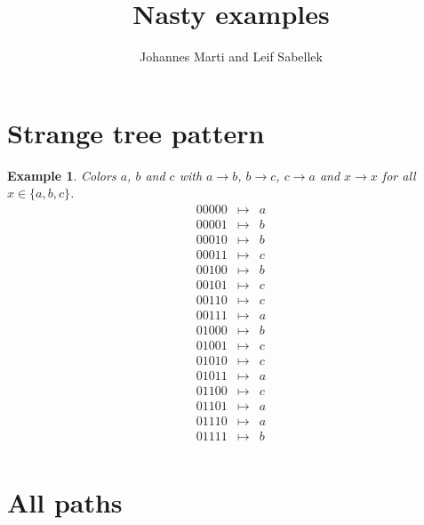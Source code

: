 \documentclass[a4paper]{article}
\title{Nasty examples}
\author{Johannes Marti and Leif Sabellek}
\newtheorem{example}{Example}[section]
\begin{document}
\maketitle

\section{Strange tree pattern}

\begin{example}
Colors $a$, $b$ and $c$ with $a \to b$, $b \to c$, $c \to a$ and $x \to
x$ for all $x \in \{a,b,c\}$.
\[
 \begin{array}{rcl}
 00000 & \mapsto & a \\
 00001 & \mapsto & b \\
 00010 & \mapsto & b \\
 00011 & \mapsto & c \\
 00100 & \mapsto & b \\
 00101 & \mapsto & c \\
 00110 & \mapsto & c \\
 00111 & \mapsto & a \\
 01000 & \mapsto & b \\
 01001 & \mapsto & c \\
 01010 & \mapsto & c \\
 01011 & \mapsto & a \\
 01100 & \mapsto & c \\
 01101 & \mapsto & a \\
 01110 & \mapsto & a \\
 01111 & \mapsto & b \\
\end{array}
\]
\end{example}


\section{All paths}
\end{document}
